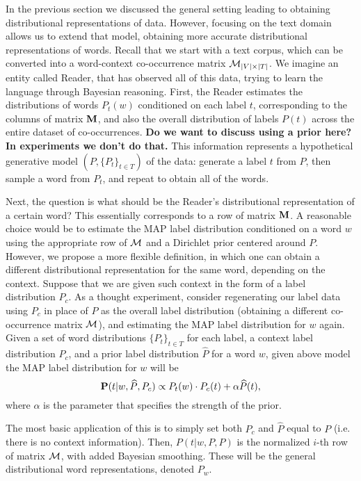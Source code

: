 In the previous section we discussed the general setting leading to
obtaining distributional representations of data. However, focusing on
the text domain allows us to extend that model, obtaining more
accurate distributional representations of words. Recall that we start
with a text corpus, which can be converted into a word-context
co-occurrence matrix ${\mathcal M}_{|V|\times|T|}$. 
We imagine an entity
called Reader, that has observed all of this data, trying to learn the
language through Bayesian reasoning. First, the Reader estimates the
distributions of words $P_t(w)$ conditioned on each 
label $t$, corresponding to the columns of matrix $\operatorname{\mathbf{M}}$, and also
the overall distribution of labels $P(t)$ across the entire dataset of 
co-occurrences. 
{\bf Do we want to discuss using a prior here? In experiments we don't
  do that.}
This information represents a hypothetical generative model
$(P,\{P_t\}_{t\in T})$ of the
data: generate a label $t$ from $P$, then sample a word from $P_t$,
and repeat to obtain all of the words. 

Next, the question is what should be  
the Reader's distributional representation of a certain word? This
essentially corresponds to a row of matrix $\operatorname{\mathbf{M}}$. A reasonable choice
would be to estimate the MAP label distribution conditioned on a word
$w$ using the appropriate row of ${\mathcal M}$ and a Dirichlet prior centered
around $P$. However, we propose
a more flexible definition, in which one can obtain a different
distributional representation for the same word, depending on the
context. Suppose that we are given such context in the form of a label
distribution $P_c$. As a thought experiment, consider regenerating our
label data using $P_c$ in place of $P$ as the overall label
distribution (obtaining a different co-occurrence matrix ${\mathcal M}$), and
estimating the MAP label distribution for $w$ again.
\bep\label{map}
Given a set of word distributions $\{P_t\}_{t\in T}$ for each label, a context label
distribution $P_c$, and a prior label distribution $\widehat{P}$ for a word $w$,
given above model the MAP label distribution for $w$ will be
\[\operatorname{\mathbf{P}}(t|w,\widehat{P},P_c) \propto P_t(w)\cdot P_c(t) + \alpha
\widehat{P}(t),\]
where $\alpha$ is the parameter that specifies the strength of the prior.
\eep

The most basic application of this is to simply set
both $P_c$ and $\widehat{P}$ equal to $P$ (i.e. there is no context
information). Then, $P(t|w,P,P)$ is the
normalized $i$-th row of matrix ${\mathcal M}$, with added Bayesian
smoothing. These will be the general distributional word
representations, denoted $P_w$. 

